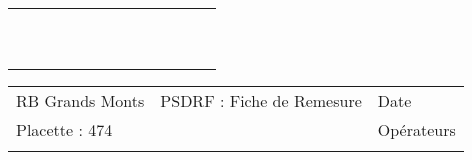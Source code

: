 \documentclass[a4paper, landscape]{article}\usepackage[]{graphicx}\usepackage[]{color}
\begin{document}
{\begin{tabular}{|p{1cm}|p{2cm}|p{1.6cm}|p{1.6cm}|p{1.6cm}|p{1.6cm}|p{1.5cm}|p{1.5cm}|p{1.5cm}|p{1.5cm}|p{1.5cm}|p{7.5cm}|p{5cm}|}
   \rowcolor[gray]{0.95} \hline
 &  &  &  &  &  &  &  &  &  &  &  &  \\ 
   \hline
 &  &  &  &  &  &  &  &  &  &  &  &  \\ 
   \rowcolor[gray]{0.95} \hline
 &  &  &  &  &  &  &  &  &  &  &  &  \\ 
   \hline
 &  &  &  &  &  &  &  &  &  &  &  &  \\ 
   \rowcolor[gray]{0.95} \hline
 &  &  &  &  &  &  &  &  &  &  &  &  \\ 
   \hline
 &  &  &  &  &  &  &  &  &  &  &  &  \\ 
   \rowcolor[gray]{0.95} \hline
 &  &  &  &  &  &  &  &  &  &  &  &  \\ 
   \hline
 &  &  &  &  &  &  &  &  &  &  &  &  \\ 
   \rowcolor[gray]{0.95} \hline
 &  &  &  &  &  &  &  &  &  &  &  &  \\ 
   \hline
 &  &  &  &  &  &  &  &  &  &  &  &  \\ 
   \rowcolor[gray]{0.95} \hline
 &  &  &  &  &  &  &  &  &  &  &  &  \\ 
   \hline
\end{tabular}
}

\begin{tabular}{p{10cm}p{10cm}p{8cm}}
  RB Grands Monts & PSDRF : Fiche de Remesure & Date \\ 
  Placette : 474 &  & Opérateurs \\ 
   &  &  \\ 
  \end{tabular}
\end{document}
